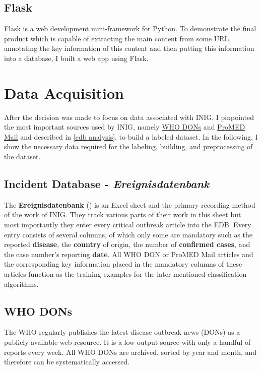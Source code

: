 
\subsection{Flask}
  Flask is a web development mini-framework for Python.
  To demonstrate the final product which is capable of extracting the main content from some URL, annotating the key information of this content and then putting this information into a database, I built a web app using Flask.

\section{Data Acquisition}
  After the decision was made to focus on data associated with INIG, I pinpointed the most important sources used by INIG, namely \href{https://www.who.int/csr/don/en/}{WHO DONs} and \href{https://www.promedmail.org}{ProMED Mail} and described in \ref{edb analysis}, to build a labeled dataset.
  In the following, I show the necessary data required for the labeling, building, and preprocessing of the dataset.

\subsection{Incident Database - \textit{Ereignisdatenbank}}
  The \textbf{Ereignisdatenbank} () is an Excel sheet and the primary recording method of the work of INIG.
  They track various parts of their work in this sheet but most importantly they enter every critical outbreak article into the EDB.
  Every entry consists of several columns, of which only some are mandatory such as the reported \textbf{disease}, the \textbf{country} of origin, the number of \textbf{confirmed cases}, and the case number's reporting \textbf{date}.
  All WHO DON or ProMED Mail articles and the corresponding key information placed in the mandatory columns of these articles function as the training examples for the later mentioned classification algorithms.

\subsection{WHO DONs}
  The WHO regularly publishes the latest disease outbreak news (DONs) as a publicly available web resource.
  It is a low output source with only a handful of reports every week.
  All WHO DONs are archived, sorted by year and month, and therefore can be systematically accessed.

